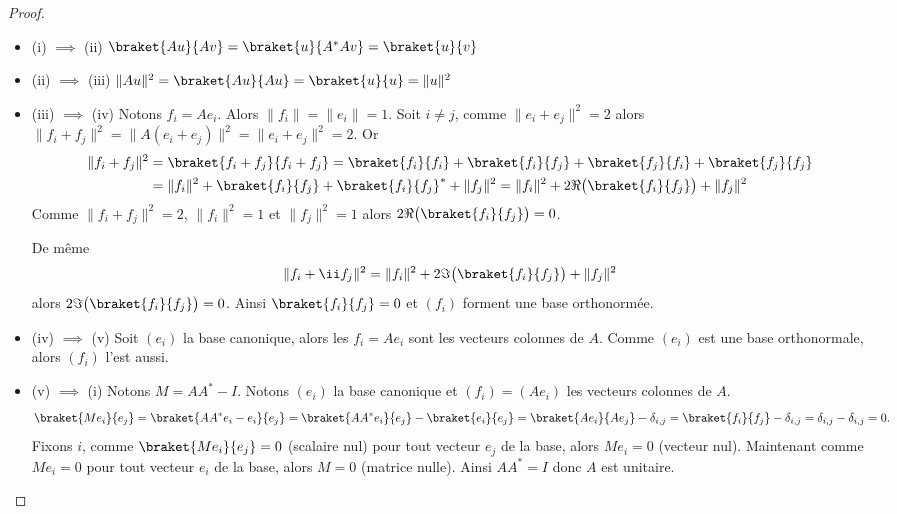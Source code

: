 \documentclass[11pt,class=report,crop=false]{standalone}
\begin{document}
\begin{proof}~
\begin{itemize}
  \item (i) $\implies$ (ii) $\braket{Au}{Av} = \braket{u}{A^*Av} = \braket{u}{v}$

  \item (ii) $\implies$ (iii) $\| Au \|^2 = \braket{Au}{Au} = \braket{u}{u} = \| u \|^2$

  \item (iii) $\implies$ (iv) Notons $f_i = Ae_i$. Alors $\| f_i \| = \| e_i \| = 1$.
  Soit $i \neq j$, comme $\| e_i + e_j \|^2 = 2$ alors $\| f_i + f_j \|^2 = \| A(e_i + e_j) \|^2= \| e_i + e_j \|^2 =2$.
  Or
\begin{align*}
\|f_i+f_j\|^2 
&= \braket{f_i+f_j}{f_i+f_j} 
= \braket{f_i}{f_i} + \braket{f_i}{f_j} +\braket{f_j}{f_i} +\braket{f_j}{f_j} \\
&=  \|f_i\|^2 + \braket{f_i}{f_j} + \braket{f_i}{f_j}^* + \|f_j\|^2 
=  \|f_i\|^2 + 2\Re\big( \braket{f_i}{f_j} \big) + \|f_j\|^2 
\end{align*}
Comme $\|f_i+f_j\|^2 =2$, $\|f_i\|^2=1$ et $\|f_j\|^2=1$ alors $2\Re\big( \braket{f_i}{f_j}\big)=0$.

De même $$\|f_i+\ii f_j\|^2 =  \|f_i\|^2 + 2\Im\big( \braket{f_i}{f_j} \big) + \|f_j\|^2 $$ alors $2\Im\big( \braket{f_i}{f_j}\big)=0$. Ainsi $\braket{f_i}{f_j}=0$ et $(f_i)$ forment une base orthonormée.

  \item (iv) $\implies$ (v) Soit $(e_i)$ la base canonique, alors les $f_i = Ae_i$ sont les vecteurs colonnes de $A$. Comme $(e_i)$ est une base orthonormale, alors $(f_i)$ l'est aussi.

  \item (v) $\implies$ (i) 
  Notons $M = AA^* - I$. Notons $(e_i)$ la base canonique et $(f_i) = (Ae_i)$ les vecteurs colonnes de $A$.
$$\braket{Me_i}{e_j} 
= \braket{AA^*e_i - e_i}{e_j}
= \braket{AA^*e_i}{e_j} - \braket{e_i}{e_j}
= \braket{Ae_i}{Ae_j} - \delta_{i,j}
= \braket{f_i}{f_j} - \delta_{i,j}
= \delta_{i,j}- \delta_{i,j}
= 0.$$
 Fixons $i$, comme $\braket{Me_i}{e_j} = 0$ (scalaire nul) pour tout vecteur $e_j$ de la base, alors $Me_i=0$ (vecteur nul). Maintenant comme $Me_i=0$ pour tout vecteur $e_i$ de la base, alors $M=0$ (matrice nulle). Ainsi $AA^* = I$ donc $A$ est unitaire.
\end{itemize}
\end{proof}

\end{document}
